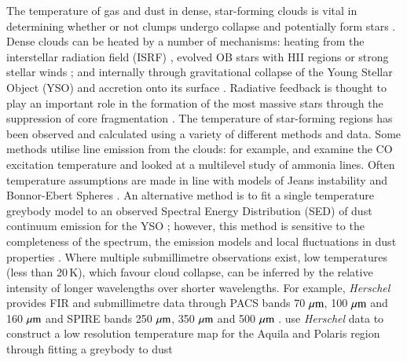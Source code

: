 The temperature of gas and dust in dense, star-forming clouds is vital in determining whether or not clumps undergo collapse 
and potentially form stars \citep{Jeans:1902dz}. Dense clouds can be heated by a number of mechanisms: heating from 
the interstellar radiation field (ISRF) \citep{Mathis:1983dq, Shirley:2000uq, Shirley:2002vn}, evolved OB stars with HII regions 
\citep{Koenig:2008jo, Deharveng:2012fk} or strong stellar winds \citep{Canto:1984dq, Ziener:1999kl, Malbet:2007zr}; and 
internally through gravitational collapse of the Young Stellar Object (YSO) and accretion onto its surface \citep{calvet98}. 
Radiative feedback is thought to play an important role in the formation of the most massive stars through the suppression of 
core fragmentation \citep{Bate:2009uq, Offner:2009pt, Hennebelle:2011ly}. 
The temperature of star-forming regions has been observed and calculated using a variety of different methods and data. 
Some methods utilise line emission from the clouds: for example, \cite{Ladd:1994ly} and \cite{Curtis:2010zr} examine the 
CO excitation temperature and \cite{Huttemeister:1993ve} looked at a multilevel study of ammonia lines. Often temperature 
assumptions are made in line with models of Jeans instability and Bonnor-Ebert Spheres \citep{Ebert:1955vn, Bonnor:1956vn, 
Johnstone:2000fk}. An alternative method is to fit a single temperature greybody model to an observed Spectral Energy Distribution (SED) 
of dust continuum emission for the YSO \citep{Hildebrand:1983fy}; however, this method is sensitive to the completeness 
of the spectrum, the emission models and local fluctuations in dust properties \citep{Konyves:2010oq, Bontemps:2010fk}.
Where multiple submillimetre observations exist, low temperatures (less than 20\,K), which favour cloud collapse, can be 
inferred by the relative intensity of longer wavelengths over shorter wavelengths. For example, \emph{Herschel}  provides FIR and 
submillimetre data through PACS bands 70\,$\,\mu\rm{m}$, 100\,$\,\mu\rm{m}$ and 160\,$\,\mu\rm{m}$ and SPIRE bands 250\,$\,\mu\rm{m}$, 
350\,$\,\mu\rm{m}$ and 500\,$\,\mu\rm{m}$ \citep{Pilbratt:2010fk}. \cite{Menshchikov:2010kl, Andre:2010kx} use \emph{Herschel} 
data to construct a low resolution temperature map for the Aquila and Polaris region through fitting a greybody to dust 
